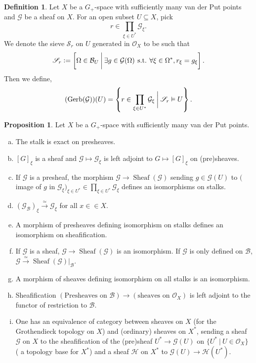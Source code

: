 \documentclass[10pt]{article}
\numberwithin{equation}{section}
\theoremstyle{definition}
\newtheorem{proposition}{Proposition}[subsection]
\newtheorem{definition}{Definition}[subsection]
\DeclareMathOperator{\straw}{s.t.}
\DeclareMathOperator{\Sheaf}{Sheaf}
\newcommand{\defeq}{\vcentcolon=}
\newcommand{\Ouv}{\mathscr{O}}
\newcommand{\sep}[0]{\:|\:}
\newcommand{\st}[0]{\:\straw\:}
\newcommand{\sS}[0]{\mathscr{S}}
\newcommand{\cB}[0]{\mathcal{B}}
\begin{document}
\begin{definition}
    Let $X$ be a $G_+$-space with sufficiently many van der Put points and $\mathcal{G}$ be a sheaf on $X$. For an open subset $U\subseteq X$, pick
    \begin{equation*}
        r\in \prod_{\xi\in U^*}\mathcal{G}_\xi.
    \end{equation*}
    We denote the sieve $\mathscr{S}_r$ on $U$ generated in $\Ouv_X$ to be such that
    \begin{equation*}
        \mathscr{S}_r \defeq \left[\Omega\in\cB_U\:\bigg{\vert}\:\exists g\in\mathcal{G}(\Omega) \st\forall \xi\in \Omega^*, r_\xi = g_\xi\right].
    \end{equation*}
    Then we define,
    \begin{equation*}
        (\mathrm{Gerb}(\mathcal{G}))(U) = \left\{r\in\prod_{\xi\in U^*}\mathcal{G}_\xi\:\bigg{\vert}\:\sS_r\vDash U\right\}.
    \end{equation*}
\end{definition}

\begin{proposition}
    \label{proposition_10_1}
    Let $X$ be a $G_+$-space with sufficiently many van der Put points.
    \begin{enumerate}[a)]
        \item The stalk is exact on presheaves.
        \item $[G]_\xi$ is a sheaf and $\mathcal{G}\mapsto\mathcal{G}_\xi$ is left adjoint to $G\mapsto [G]_\xi$ on (pre)sheaves.
        \item If $\mathcal{G}$ is a presheaf, the morphism $\mathcal{G}\to\Sheaf(\mathcal{G})$ sending $g\in\mathcal{G}(U)$ to $($image of $g$ in $\mathcal{G}_\xi)_{\xi\in U^*}\in\prod_{\xi\in U^*}\mathcal{G}_\xi$ defines an isomorphisms on stalks.
        \item $(\mathcal{G}_\cB)_\xi\stackrel{\simeq}{\to}\mathcal{G}_\xi$ for all $x\in\in X$.
        \item A morphism of presheaves defining isomorphism on stalks defines an isomorphism on sheafification.
        \item If $\mathcal{G}$ is a sheaf, $\mathcal{G}\to\Sheaf(\mathcal{G})$ is an isomorphism. If $\mathcal{G}$ is only defined on $\cB$, $\mathcal{G}\stackrel{\simeq}{\to}\Sheaf(\mathcal{G})|_\cB$.
        \item A morphism of sheaves defining isomorphism on all stalks is an isomorphism.
        \item Sheafification $(\text{Presheaves on $\cB$})\to(\text{sheaves on $\Ouv_X$})$ is left adjoint to the functor of restriction to $\cB$.
        \item One has an equivalence of category between sheaves on $X$ (for the Grothendieck topology on $X$) and (ordinary) sheaves on $X^*$, sending a sheaf $\mathcal{G}$ on $X$ to the sheafification of the (pre)sheaf $U^*\to \mathcal{G}(U)$ on $\{U^*\sep U\in\Ouv_X\}$ ( a topology base for $X^*$) and a sheaf $\mathcal{H}$ on $X^*$ to $\mathcal{G}(U)\to\mathcal{H}(U^*)$.
    \end{enumerate}
\end{proposition}
\end{document}
